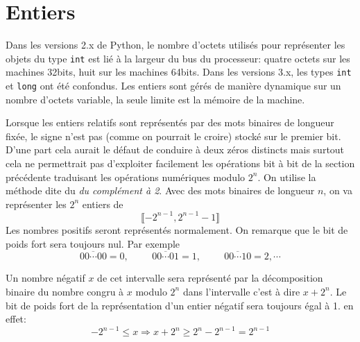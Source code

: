 \section{Entiers}
Dans les versions 2.x de Python, le nombre d'octets utilisés pour représenter les objets du type \verb|int| est lié à la largeur du bus du processeur:  quatre octets sur les machines 32bits, huit sur les machines 64bits. Dans les versions 3.x, les types \verb|int| et \verb|long| ont été confondus. Les entiers sont gérés de manière dynamique sur un nombre d'octets variable, la seule limite est la mémoire de la machine.

Lorsque les entiers relatifs sont représentés par des mots binaires de longueur fixée, le signe n'est pas (comme on pourrait le croire) stocké sur le premier bit. D'une part cela aurait le défaut de conduire à deux zéros distincts mais surtout cela ne permettrait pas d'exploiter facilement les opérations bit à bit de la section précédente traduisant les opérations numériques modulo $2^n$.\newline 
On utilise la méthode dite du \emph{du complément à 2}.\newline
Avec des mots binaires de longueur $n$, on va représenter les $2^n$ entiers de 
\begin{displaymath}
  \llbracket -2^{n-1}, 2^{n-1}-1 \rrbracket
\end{displaymath}
Les nombres positifs seront représentés normalement. On remarque que le bit de poids fort sera toujours nul. Par exemple
\begin{displaymath}
  \overline{00\cdots00} = 0, \hspace{1cm}\overline{00\cdots01} = 1, \hspace{1cm}\overline{00\cdots10} = 2, \cdots
\end{displaymath}

Un nombre négatif $x$ de cet intervalle sera représenté par la décomposition binaire du nombre congru à $x$ modulo $2^{n}$ dans l'intervalle c'est à dire $x + 2^n$.\newline
Le bit de poids fort de la représentation d'un entier négatif sera toujours égal à 1. en effet:
\begin{displaymath}
  -2^{n-1} \leq x \Rightarrow x + 2^n \geq 2^n - 2^{n-1} = 2^{n-1}
\end{displaymath}

